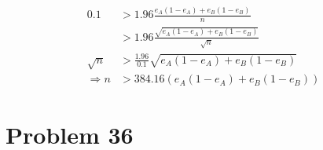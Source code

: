 \documentclass[12pt]{article}
\begin{document}
\begin{align*}
    0.1 &> 1.96 \frac{e_A(1-e_A) + e_B(1-e_B)}{n} \\
    &> 1.96 \frac{\sqrt{e_A(1-e_A) + e_B(1-e_B)}}{\sqrt{n}} \\
    \sqrt{n} &> \frac{1.96}{0.1} \sqrt{e_A(1-e_A) + e_B(1-e_B)} \\
    \Longrightarrow n &> 384.16 (e_A(1-e_A) + e_B(1-e_B))
\end{align*}




\section{Problem 36}

%
\end{document}
